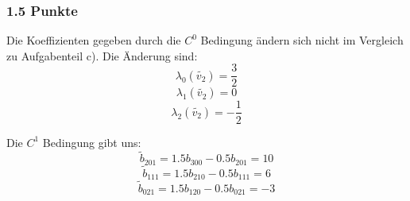 \subsubsection{1.5 Punkte}
Die Koeffizienten gegeben durch die $C^0$ Bedingung ändern sich nicht im Vergleich zu Aufgabenteil c). Die Änderung sind:\\
$$ \lambda_0(\tilde{v_2}) = \frac{3}{2}$$
 $$ \lambda_1(\tilde{v_2})= 0$$
$$ \lambda_2(\tilde{v_2}) = -\frac{1}{2}$$

Die $C^1$ Bedingung gibt uns:\\
$$\tilde{b}_{201} = 1.5 b_{300}  - 0.5  b_{201} = 10$$
$$\tilde{b}_{111} = 1.5 b_{210}  - 0.5  b_{111} = 6$$
$$\tilde{b}_{021} = 1.5 b_{120}  - 0.5  b_{021} = -3$$